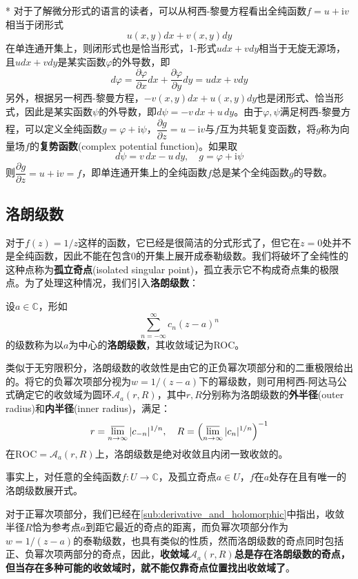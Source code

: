 \begin{remark}*
    对于了解微分形式的语言的读者，可以从柯西-黎曼方程看出全纯函数$f=u+\mathrm{i}v$相当于闭形式
    $$u(x,y)dx+v(x,y)dy$$
    在单连通开集上，则闭形式也是恰当形式，1-形式$udx+vdy$相当于无旋无源场，且$udx+vdy$是某实函数$\varphi$的外导数，即
    $$d\varphi=\dfrac{\partial \varphi}{\partial x}dx+\dfrac{\partial \varphi}{\partial y}dy=udx+vdy$$
    另外，根据另一柯西-黎曼方程，$-v(x,y)dx+u(x,y)dy$也是闭形式、恰当形式，因此是某实函数$\psi$的外导数，即$d\psi=-v\,dx+u\,dy$。由于$\varphi,\psi$满足柯西-黎曼方程，可以定义全纯函数$g=\varphi+\mathrm{i}\psi$，$\dfrac{\partial g}{\partial z}=u-\mathrm{i}v$与$f$互为共轭复变函数，将$g$称为向量场$f$的\textbf{复势函数}(complex potential function)。如果取
    $$d\psi=v\,dx-u\,dy,\quad g=\varphi+\mathrm{i}\psi$$
    则$\dfrac{\partial g}{\partial z}=u+\mathrm{i}v=f$，即单连通开集上的全纯函数$f$总是某个全纯函数$g$的导数。
\end{remark}

\subsection{洛朗级数}\label{sub:laurant_series}
对于$f(z)=1/z$这样的函数，它已经是很简洁的分式形式了，但它在$z=0$处并不是全纯函数，因此不能在包含0的开集上展开成泰勒级数。我们将破坏了全纯性的这种点称为\textbf{孤立奇点}(isolated singular point)，孤立表示它不构成奇点集的极限点。为了处理这种情况，我们引入\textbf{洛朗级数}：

\begin{definition}[洛朗级数]
    设$a\in\mathbb{C}$，形如
    \[\sum_{n=-\infty}^{\infty}c_n(z-a)^n\]
    的级数称为以$a$为中心的\textbf{洛朗级数}，其收敛域记为ROC。

    类似于无穷限积分，洛朗级数的收敛性是由它的正负幂次项部分和的二重极限给出的。将它的负幂次项部分视为$w=1/(z-a)$下的幂级数，则可用柯西-阿达马公式确定它的收敛域为圆环$\mathcal{A} _a(r,R)$，其中$r,R$分别称为洛朗级数的\textbf{外半径}(outer radius)和\textbf{内半径}(inner radius)，满足：
    \[r=\varlimsup_{n\to\infty}|c_{-n}|^{1/n},\quad R=\left(\varlimsup_{n\to\infty}|c_n|^{1/n}\right)^{-1}\]
    在$\mathrm{ROC}=\mathcal{A} _a(r,R)$上，洛朗级数是绝对收敛且内闭一致收敛的。
\end{definition}
事实上，对任意的全纯函数$f:U\to\mathbb{C}$，及孤立奇点$a\in U$，$f$在$a$处存在且有唯一的洛朗级数展开式。

对于正幂次项部分，我们已经在\ref{sub:derivative_and_holomorphic}中指出，收敛半径$R$恰为参考点$a$到距它最近的奇点的距离，而负幂次项部分作为$w=1/(z-a)$的泰勒级数，也具有类似的性质，然而洛朗级数的奇点同时包括正、负幂次项两部分的奇点，因此，\textbf{收敛域$\mathcal{A} _a(r,R)$总是存在洛朗级数的奇点，但当存在多种可能的收敛域时，就不能仅靠奇点位置找出收敛域了}。

